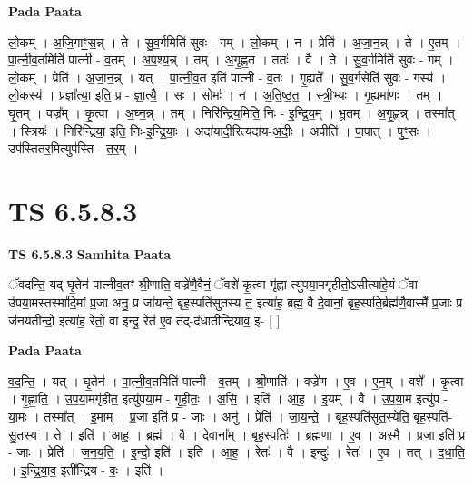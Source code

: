 \documentclass[17pt]{extarticle}
\begin{document}
\textbf{Pada Paata} \newline

लो॒कम् । अ॒जि॒गाꣳ॒॒स॒न्न् । ते । सु॒व॒र्गमिति॑ सुवः - गम् । लो॒कम् । न । प्रेति॑ । अ॒जा॒न॒न्न् । ते । ए॒तम् । पा॒त्नी॒व॒तमिति॑ पात्नी - व॒तम् । अ॒प॒श्य॒न्न् । तम् । अ॒गृ॒ह्ण॒त । ततः॑ । वै । ते । सु॒व॒र्गमिति॑ सुवः - गम् । लो॒कम् । प्रेति॑ । अ॒जा॒न॒न्न् । यत् । पा॒त्नी॒व॒त इति॑ पात्नी - व॒तः । गृ॒ह्यते᳚ । सु॒व॒र्गसेति॑ सुवः - गस्य॑ । लो॒कस्य॑ । प्रज्ञा᳚त्या॒ इति॒ प्र - ज्ञा॒त्यै॒ । सः । सोमः॑ । न । अ॒ति॒ष्ठ॒त॒ । स्त्री॒भ्यः । गृ॒ह्यमा॑णः । तम् । घृ॒तम् । वज्र᳚म् । कृ॒त्वा । अ॒घ्न॒न्न् । तम् । निरि॑न्द्रिय॒मिति॒ निः - इ॒न्द्रि॒य॒म् । भू॒तम् । अ॒गृ॒ह्ण॒न्न् । तस्मा᳚त् । स्त्रियः॑ । निरि॑न्द्रिया॒ इति॒ निः-इ॒न्द्रि॒याः॒ । अदा॑यादी॒रित्यदा॑य-अ॒दीः॒ । अपीति॑ । पा॒पात् । पुꣳ॒॒सः । उप॑स्तितर॒मित्युप॑स्ति - त॒र॒म् ।  \newline




\section*{ TS 6.5.8.3 }

\textbf{TS 6.5.8.3 } \newline
\textbf{Samhita Paata} \newline

ॅवदन्ति॒ यद्-घृ॒तेन॑ पात्नीव॒तꣳ श्री॒णाति॒ वज्रे॑णै॒वैनं॒ ॅवशे॑ कृ॒त्वा गृ॑ह्णा-त्युपया॒मगृ॑हीतो॒ऽसीत्या॑हे॒यं ॅवा उ॑पया॒मस्तस्मा॑दि॒मां प्र॒जा अनु॒ प्र जा॑यन्ते॒ बृह॒स्पति॑सुतस्य त॒ इत्या॑ह॒ ब्रह्म॒ वै दे॒वानां॒ बृह॒स्पति॒र्ब्रह्म॑णै॒वास्मै᳚ प्र॒जाः प्र ज॑नयतीन्दो॒ इत्या॑ह॒ रेतो॒ वा इन्दू॒ रेत॑ ए॒व तद्-द॑धातीन्द्रियाव॒ इ- [  ] \newline

\textbf{Pada Paata} \newline

व॒द॒न्ति॒ । यत् । घृ॒तेन॑ । पा॒त्नी॒व॒तमिति॑ पात्नी - व॒तम् । श्री॒णाति॑ । वज्रे॑ण । ए॒व । ए॒न॒म् । वशे᳚ । कृ॒त्वा । गृ॒ह्णा॒ति॒ । उ॒प॒या॒मगृ॑हीत॒ इत्यु॑पया॒म - गृ॒ही॒तः॒ । अ॒सि॒ । इति॑ । आ॒ह॒ । इ॒यम् । वै । उ॒प॒या॒म इत्यु॑प - या॒मः । तस्मा᳚त् । इ॒माम् । प्र॒जा इति॑ प्र - जाः । अनु॑ । प्रेति॑ । जा॒य॒न्ते॒ । बृह॒स्पति॑सुत॒स्येति॒ बृह॒स्पति॑-सु॒त॒स्य॒ । ते॒ । इति॑ । आ॒ह॒ । ब्रह्म॑ । वै । दे॒वाना᳚म् । बृह॒स्पतिः॑ । ब्रह्म॑णा । ए॒व । अ॒स्मै॒ । प्र॒जा इति॑ प्र - जाः । प्रेति॑ । ज॒न॒य॒ति॒ । इ॒न्दो॒ इति॑ । इति॑ । आ॒ह॒ । रेतः॑ । वै । इन्दुः॑ । रेतः॑ । ए॒व । तत् । द॒धा॒ति॒ । इ॒न्द्रि॒या॒व॒ इती᳚न्द्रिय - वः॒ । इति॑ ।  \newline
\end{document}
